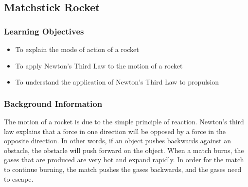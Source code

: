 %



\subsection{Matchstick Rocket}

\subsubsection*{Learning Objectives}
\begin{itemize}
\item{To explain the mode of action of a rocket} 
\item{To apply Newton's Third Law to the motion of a rocket} 
\item{To understand the application of Newton's Third Law to propulsion} 
\end{itemize}

\subsubsection*{Background Information}
The motion of a rocket is due to the simple principle of reaction.  Newton's third law explains that a force in one direction will be opposed by a force in the opposite direction.  In other words, if an object pushes backwards against an obstacle, the obstacle will push forward on the object.  When a match burns, the gases that are produced are very hot and expand rapidly. In order for the match to continue burning, the match pushes the gases backwards, and the gases need to escape.

